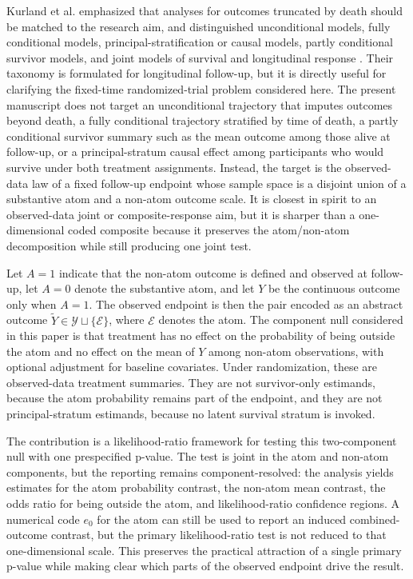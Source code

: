 \documentclass[11pt]{article}
\begin{document}
Kurland et al. emphasized that analyses for outcomes truncated by death should be matched to the research aim, and distinguished unconditional models, fully conditional models, principal-stratification or causal models, partly conditional survivor models, and joint models of survival and longitudinal response \citep{Kurland_2009}. Their taxonomy is formulated for longitudinal follow-up, but it is directly useful for clarifying the fixed-time randomized-trial problem considered here. The present manuscript does not target an unconditional trajectory that imputes outcomes beyond death, a fully conditional trajectory stratified by time of death, a partly conditional survivor summary such as the mean outcome among those alive at follow-up, or a principal-stratum causal effect among participants who would survive under both treatment assignments. Instead, the target is the observed-data law of a fixed follow-up endpoint whose sample space is a disjoint union of a substantive atom and a non-atom outcome scale. It is closest in spirit to an observed-data joint or composite-response aim, but it is sharper than a one-dimensional coded composite because it preserves the atom/non-atom decomposition while still producing one joint test.

Let $A=1$ indicate that the non-atom outcome is defined and observed at follow-up, let $A=0$ denote the substantive atom, and let $Y$ be the continuous outcome only when $A=1$. The observed endpoint is then the pair encoded as an abstract outcome $\widetilde{Y}\in\mathcal{Y}\sqcup\{\mathcal{E}\}$, where $\mathcal{E}$ denotes the atom. The component null considered in this paper is that treatment has no effect on the probability of being outside the atom and no effect on the mean of $Y$ among non-atom observations, with optional adjustment for baseline covariates. Under randomization, these are observed-data treatment summaries. They are not survivor-only estimands, because the atom probability remains part of the endpoint, and they are not principal-stratum estimands, because no latent survival stratum is invoked.

The contribution is a likelihood-ratio framework for testing this two-component null with one prespecified p-value. The test is joint in the atom and non-atom components, but the reporting remains component-resolved: the analysis yields estimates for the atom probability contrast, the non-atom mean contrast, the odds ratio for being outside the atom, and likelihood-ratio confidence regions. A numerical code $e_0$ for the atom can still be used to report an induced combined-outcome contrast, but the primary likelihood-ratio test is not reduced to that one-dimensional scale. This preserves the practical attraction of a single primary p-value while making clear which parts of the observed endpoint drive the result.
\end{document}
